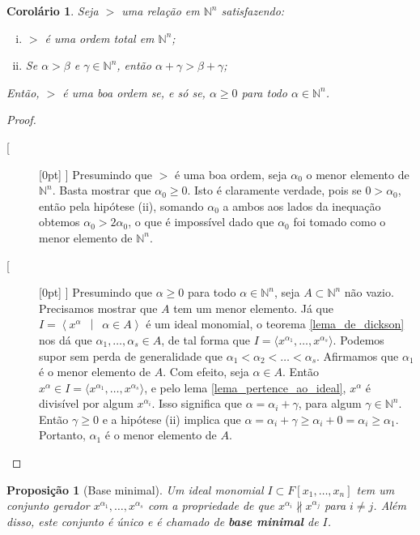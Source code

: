 \documentclass[12pt,a4paper]{report}
\newcommand{\N}{\mathbb{N}}
\newcommand{\suchthat}{\enspace\middle|\enspace}
\newcommand{\ndivides}{\nparallel}
\newcommand{\boxedLeftArrow}{\raisebox{2pt}[\height][0pt]{
    \framebox{\raisebox{-1pt}[\height][0pt]{\(\Leftarrow\)}}}\enspace}
\newcommand{\boxedRightArrow}{\raisebox{2pt}[\height][0pt]{
    \framebox{\raisebox{-1pt}[\height][0pt]{\(\Rightarrow\)}}}\enspace}
\newtheorem{proposition}[theorem]{Proposição}
\newtheorem{corollary}[theorem]{Corolário}
\numberwithin{theorem}{chapter}
\begin{document}
\begin{corollary}
  Seja \(>\) uma relação em \(\N^n\) satisfazendo:
  \begin{enumerate}[(i)]
  \item \(>\) é uma ordem total em \(\N^n\);
  \item Se \(\alpha > \beta\) e \(\gamma \in \N^n\), então \(\alpha
    + \gamma > \beta + \gamma\);
  \end{enumerate}
  Então, \(>\) é uma boa ordem se, e só se, \(\alpha \geq 0\) para
  todo \(\alpha \in \N^n\).
\end{corollary}

\begin{proof}\mbox{}
  \begin{description}
  \item[\boxedRightArrow] Presumindo que \(>\) é uma boa ordem, seja
    \(\alpha_0\) o menor elemento de \(\N^n\).  Basta mostrar que
    \(\alpha_0 \geq 0\).  Isto é claramente verdade, pois se \(0 >
    \alpha_0\), então pela hipótese (ii), somando \(\alpha_0\) a ambos
    aos lados da inequação obtemos \(\alpha_0 > 2\alpha_0\), o que é
    impossível dado que \(\alpha_0\) foi tomado como o menor elemento
    de \(\N^n\).

  \item[\boxedLeftArrow] Presumindo que \(\alpha \geq 0\) para todo
    \(\alpha \in \N^n\), seja \(A \subset \N^n\) não vazio.
    Precisamos mostrar que \(A\) tem um menor elemento.  Já que \(I =
    \left\langle x^\alpha \suchthat \alpha \in A \right\rangle\) é um
    ideal monomial, o teorema \ref{lema_de_dickson} nos dá que
    \(\alpha_1,\ldots,\alpha_s \in A\), de tal forma que \(I = \langle
    x^{\alpha_1},\ldots,x^{\alpha_s} \rangle\).  Podemos supor sem
    perda de generalidade que \(\alpha_1 < \alpha_2 < \ldots <
    \alpha_s\).  Afirmamos que \(\alpha_1\) é o menor elemento de
    \(A\).  Com efeito, seja \(\alpha \in A\).  Então \(x^\alpha \in I
    = \langle x^{\alpha_1},\ldots,x^{\alpha_s} \rangle\), e pelo lema
    \ref{lema_pertence_ao_ideal}, \(x^\alpha\) é divisível por algum
    \(x^{\alpha_i}\).  Isso significa que \(\alpha = \alpha_i +
    \gamma\), para algum \(\gamma \in \N^n\).  Então \(\gamma \geq 0\)
    e a hipótese (ii) implica que \(\alpha = \alpha_i + \gamma \geq
    \alpha_i + 0 = \alpha_i \geq \alpha_1\).  Portanto, \(\alpha_1\) é
    o menor elemento de \(A\).
  \end{description}
\end{proof}

\begin{proposition}[Base minimal]
  Um ideal monomial \(I \subset F[x_1,\ldots,x_n]\) tem um conjunto
  gerador \(x^{\alpha_1},\ldots,x^{\alpha_s}\) com a propriedade de
  que \(x^{\alpha_i} \ndivides x^{\alpha_j}\) para \(i \neq j\).  Além
  disso, este conjunto é único e é chamado de \textbf{base minimal} de
  \(I\).
\end{proposition}
\end{document}

